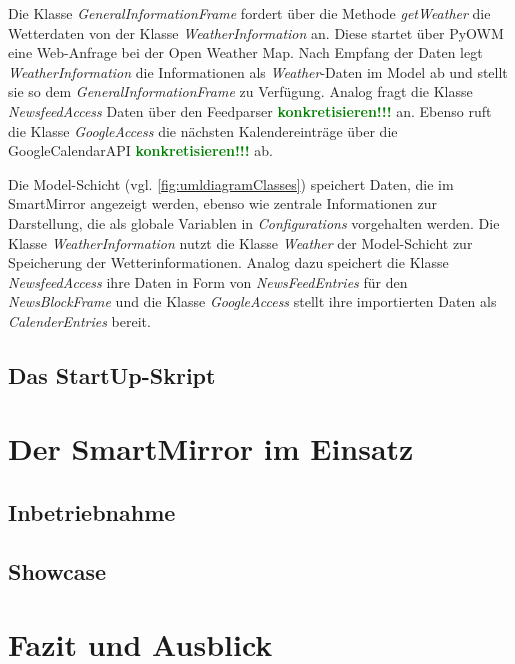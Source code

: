  Die Klasse \textit{GeneralInformationFrame} fordert über die Methode \textit{getWeather} die Wetterdaten von der Klasse \textit{WeatherInformation} an. Diese startet über PyOWM eine Web-Anfrage bei der Open Weather Map. Nach Empfang der Daten legt \textit{WeatherInformation} die Informationen als \textit{Weather}-Daten im Model ab und stellt sie so dem \textit{GeneralInformationFrame} zu Verfügung. 
 Analog fragt die Klasse \textit{NewsfeedAccess} Daten über den Feedparser \textcolor{green}{\textbf{konkretisieren!!!}} an. 
 Ebenso ruft die Klasse \textit{GoogleAccess} die nächsten Kalendereinträge über die GoogleCalendarAPI \textcolor{green}{\textbf{konkretisieren!!!}} ab.
 
 Die Model-Schicht (vgl. \autoref{fig:umldiagramClasses}) speichert Daten, die im SmartMirror angezeigt werden, ebenso wie zentrale Informationen zur Darstellung, die als globale Variablen in \textit{Configurations} vorgehalten werden. Die Klasse \textit{WeatherInformation} nutzt die Klasse \textit{Weather} der Model-Schicht zur Speicherung der Wetterinformationen. 
 Analog dazu speichert die Klasse \textit{NewsfeedAccess} ihre Daten in Form von \textit{NewsFeedEntries} für den \textit{NewsBlockFrame} und die Klasse \textit{GoogleAccess} stellt ihre importierten Daten  als \textit{CalenderEntries} bereit.
 

\subsection{Das StartUp-Skript}

\section{Der SmartMirror im Einsatz}
\subsection{Inbetriebnahme}
\subsection{Showcase}

\section{Fazit und Ausblick}
